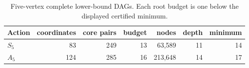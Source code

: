 \begin{table}[htbp]
\centering
\caption{Five-vertex complete lower-bound DAGs.  Each root budget is one below
the displayed certified minimum.}
\label{tab:n5-dag}
\begin{tabular}{lrrrrrr}
\toprule
Action & coordinates & core pairs & budget & nodes & depth & minimum\\
\midrule
$S_5$ & 83 & 249 & 13 & 63,589 & 11 & 14\\
$A_5$ & 124 & 285 & 16 & 213,648 & 14 & 17\\
\bottomrule
\end{tabular}
\end{table}
